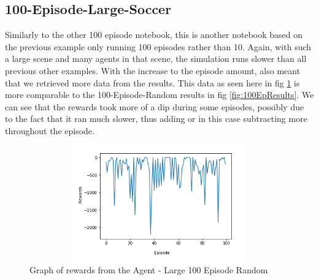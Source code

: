 \subsection{100-Episode-Large-Soccer}
Similarly to the other 100 episode notebook, this is another notebook based on the previous example only running 100 episodes rather than 10. Again, with such a large scene and many agents in that scene, the simulation runs slower than all previous other examples. With the increase to the episode amount, also meant that we retrieved more data from the results. This data as seen here in fig \ref{fig:100EpLarge} is more comparable to the 100-Episode-Random results in fig \ref{fig:100EpResults}. We can see that the rewards took more of a dip during some episodes, possibly due to the fact that it ran much slower, thus adding or in this case subtracting more throughout the episode.


\begin{figure}[H]
    \centering
    \includegraphics[width=120mm, height=50mm]{img/random100results.PNG}
    \caption{Graph of rewards from the Agent - Large 100 Episode Random}
    \label{fig:100EpLarge}
\end{figure}
